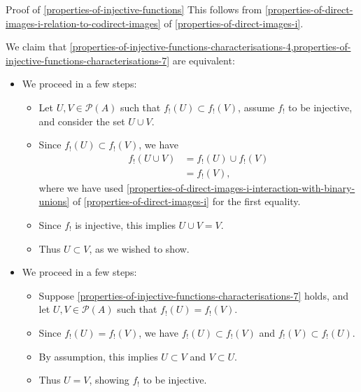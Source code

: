 \begin{Proof}{Proof of \cref{properties-of-injective-functions}}
    This follows from \cref{properties-of-direct-images-i-relation-to-codirect-images} of \cref{properties-of-direct-images-i}.

    We claim that \cref{properties-of-injective-functions-characterisations-4,properties-of-injective-functions-characterisations-7} are equivalent:
    \begin{itemize}
        \item{}We proceed in a few steps:
            \begin{itemize}
                \item Let $U,V\in\mathcal{P}(A)$ such that $f_{!}(U)\subset f_{!}(V)$, assume $f_{!}$ to be injective, and consider the set $U\cup V$.
                \item Since $f_{!}(U)\subset f_{!}(V)$, we have
                    \begin{align*}
                        f_{!}(U\cup V) &= f_{!}(U)\cup f_{!}(V)\\
                                       &= f_{!}(V),
                    \end{align*}
                    where we have used \cref{properties-of-direct-images-i-interaction-with-binary-unions} of \cref{properties-of-direct-images-i} for the first equality.
                \item Since $f_{!}$ is injective, this implies $U\cup V=V$.
                \item Thus $U\subset V$, as we wished to show.
            \end{itemize}
        \item{}We proceed in a few steps:
            \begin{itemize}
                \item Suppose \cref{properties-of-injective-functions-characterisations-7} holds, and let $U,V\in\mathcal{P}(A)$ such that $f_{!}(U)=f_{!}(V)$.
                \item Since $f_{!}(U)=f_{!}(V)$, we have $f_{!}(U)\subset f_{!}(V)$ and $f_{!}(V)\subset f_{!}(U)$.
                \item By assumption, this implies $U\subset V$ and $V\subset U$.
                \item Thus $U=V$, showing $f_{!}$ to be injective.
            \end{itemize}
    \end{itemize}


\end{Proof}
